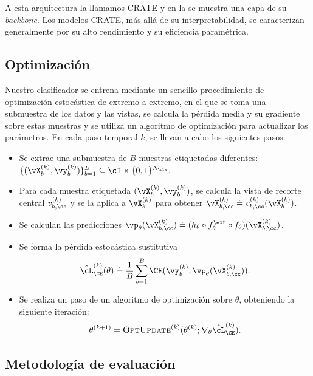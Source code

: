 \documentclass[../../book-main_es.tex]{subfiles}
\begin{document}
A esta arquitectura la llamamos CRATE y en la  se muestra
una capa de su \textit{backbone}. Los modelos CRATE, más allá de su interpretabilidad,
se caracterizan generalmente por su alto rendimiento y su eficiencia paramétrica.

\subsection{Optimización} \label{sub:image_classification_optimization}

Nuestro clasificador se entrena mediante un sencillo procedimiento de optimización estocástica de extremo a extremo,
en el que se toma una submuestra de los datos y las vistas, se calcula
la pérdida media y su gradiente sobre estas muestras y se utiliza un
algoritmo de optimización para actualizar los parámetros. En cada paso temporal \(k\), se llevan a cabo los siguientes pasos:
\begin{itemize}
\item Se extrae una submuestra de \(B\) muestras etiquetadas diferentes: \(\{(\vX_{b}^{(k)},
    \vy_{b}^{(k)})\}_{b = 1}^{B} \subseteq \cI \times \{0, 1\}^{N_{\cls}}\).
\item Para cada muestra etiquetada \((\vX_{b}^{(k)}, \vy_{b}^{(k)})\),
    se calcula la vista de recorte central \(v_{b, \cc}^{(k)}\) y se la aplica
    a \(\vX_{b}^{(k)}\) para obtener \(\vX_{b, \cc}^{(k)} \doteq v_{b,
    \cc}^{(k)}(\vX_{b}^{(k)})\).
\item Se calculan las predicciones \(\vp_{\theta}(\vX_{b, \cc}^{(k)})
        \doteq (h_{\theta} \circ f_{\theta}^{\ext} \circ
    f_{\theta})(\vX_{b, \cc}^{(k)})\).
\item Se forma la pérdida estocástica sustitutiva
    \begin{equation}
        \hat{\cL}_{\CE}^{(k)}(\theta) \doteq \frac{1}{B}\sum_{b =
        1}^{B}\CE(\vy_{b}^{(k)}, \vp_{\theta}(\vX_{b, \cc}^{(k)})).
    \end{equation}
\item Se realiza un paso de un algoritmo de optimización sobre \(\theta\),
    obteniendo la siguiente iteración:
    \begin{equation}
        \theta^{(k + 1)} \doteq
        \textsc{OptUpdate}^{(k)}(\theta^{(k)};
        \nabla_{\theta}\hat{\cL}_{\CE}^{(k)}).
    \end{equation}
\end{itemize}

\subsection{Metodología de evaluación} \label{sub:image_classification_evals}
\end{document}
